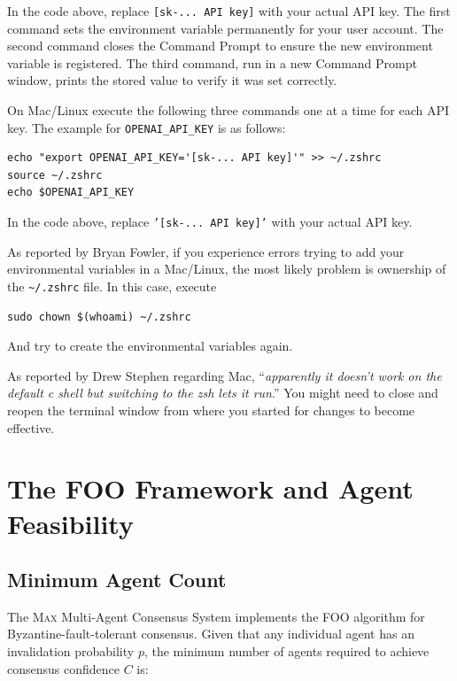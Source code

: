 In the code above, replace \texttt{[sk-... API key]} with your actual API key. The first command sets the environment variable permanently for your user account. The second command closes the Command Prompt to ensure the new environment variable is registered. The third command, run in a new Command Prompt window, prints the stored value to verify it was set correctly.

\vs

On Mac/Linux execute the following three commands one at a time for each API key. The example for \texttt{OPENAI\_API\_KEY} is as follows:

\begin{verbatim}
echo "export OPENAI_API_KEY='[sk-... API key]'" >> ~/.zshrc
source ~/.zshrc
echo $OPENAI_API_KEY
\end{verbatim}

In the code above, replace \texttt{'[sk-... API key]'} with your actual API key.

\vs

As reported by Bryan Fowler, if you experience errors trying to add your environmental variables in a Mac/Linux, the most likely problem is ownership of the \texttt{\~{}/.zshrc} file. In this case, execute

\begin{verbatim}
sudo chown $(whoami) ~/.zshrc
\end{verbatim}

And try to create the environmental variables again.

\vs

As reported by Drew Stephen regarding Mac, ``\textit{apparently it doesn't work on the default c shell but switching to the zsh lets it run}.'' You might need to close and reopen the terminal window from where you started for changes to become effective.

\section{The FOO Framework and Agent Feasibility}
\label{sec:foo}

\subsection{Minimum Agent Count}

The \textsc{Max} Multi-Agent Consensus System implements the FOO
algorithm for Byzantine-fault-tolerant consensus. Given that any
individual agent has an invalidation probability $p$, the minimum number
of agents required to achieve consensus confidence $C$ is:

